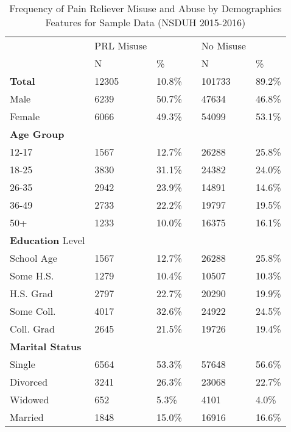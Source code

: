 \documentclass[sigconf]{acmart}
\begin{document}
\begin{table}
  \caption{Frequency of Pain Reliever Misuse and Abuse
  by Demographics Features for Sample Data (NSDUH 2015-2016)}
  \label{tab:freq}
  \begin{tabular}{llllll}
    \toprule
              & PRL Misuse & & & No Misuse & \\
              & N & \% &  & N & \% \\
    \midrule
    \textbf{Total}     & 12305 & 10.8\% & & 101733 & 89.2\% \\
    Male      & 6239 & 50.7\% & & 47634 & 46.8\%  \\
    Female    & 6066 & 49.3\% & & 54099 & 53.1\%  \\
    \midrule
    \textbf{Age Group} &  &  &  &  & \\
    12-17     & 1567 & 12.7\% & & 26288 & 25.8\% \\
    18-25     & 3830 & 31.1\% & & 24382 & 24.0\% \\
    26-35     & 2942 & 23.9\% & & 14891 & 14.6\% \\
    36-49     & 2733 & 22.2\% & & 19797 & 19.5\% \\
    50+       & 1233 & 10.0\% & & 16375 & 16.1\% \\
    \midrule
    \textbf{Education} Level &  &  &  &  & \\
    School Age & 1567 & 12.7\% & & 26288 & 25.8\% \\
    Some H.S.  & 1279 & 10.4\% & & 10507 & 10.3\% \\
    H.S. Grad  & 2797 & 22.7\% & & 20290 & 19.9\% \\
    Some Coll. & 4017 & 32.6\% & & 24922 & 24.5\% \\
    Coll. Grad & 2645 & 21.5\% & & 19726 & 19.4\% \\
    \midrule
    \textbf{Marital Status} &  &  &  &  & \\
    Single    & 6564 & 53.3\% & & 57648 & 56.6\% \\
    Divorced  & 3241 & 26.3\% & & 23068 & 22.7\% \\
    Widowed   &  652 &  5.3\% & &  4101 &  4.0\% \\
    Married   & 1848 & 15.0\% & & 16916 & 16.6\% \\
    
    \bottomrule
  \end{tabular}
\end{table}

\end{document}
